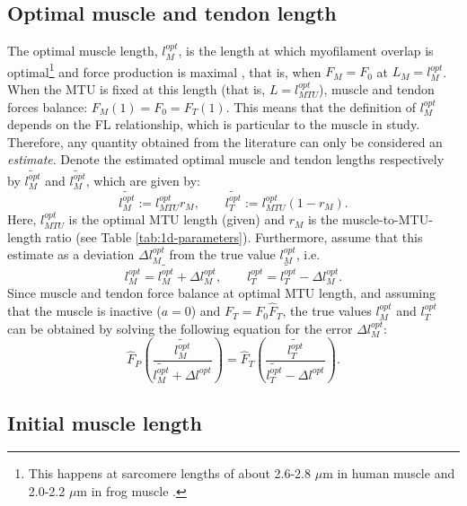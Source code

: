 \documentclass{sfuthesis}
\numberwithin{equation}{section}
\numberwithin{figure}{chapter}
\numberwithin{table}{chapter}
\theoremstyle{definition}
\begin{document}
\subsection{Optimal muscle and tendon length} \label{sec:optimal_muscle_length}

The optimal muscle length, $l_M^{opt}$, is the length at which myofilament overlap is optimal\footnote{This happens at sarcomere lengths of about 2.6-2.8 $\mu$m in human muscle and 2.0-2.2 $\mu$m in frog muscle \cite{FridenLieber1998}.} and force production is maximal \cite{FridenLieber1998}, that is, when $F_M = F_0$ at $L_M = l_M^{opt}$. When the MTU is fixed at this length (that is, $L = l_{MTU}^{opt}$), muscle and tendon forces balance:
$F_M(1) = F_0 = F_T(1)$. This means that the definition of $l_M^{opt}$ depends on the FL relationship, which is particular to the muscle in study. Therefore, any quantity obtained from the literature can only be considered an \textit{estimate}. Denote the estimated optimal muscle and tendon lengths respectively by $\widetilde{l_M^{opt}}$ and $\widetilde{l_M^{opt}}$, which are given by:
\begin{equation}
	\widetilde{l_M^{opt}} := l_{MTU}^{opt} r_M, \qquad \widetilde{l_T^{opt}} := l_{MTU}^{opt}(1-r_M).
\end{equation}
Here, $l_{MTU}^{opt}$ is the optimal MTU length (given) and $r_M$ is the muscle-to-MTU-length ratio (see Table \ref{tab:1d-parameters}). Furthermore, assume that this estimate as a deviation $\Delta l_M^{opt}$ from the true value $l_M^{opt}$, i.e.
\begin{equation}
    l_M^{opt} = \widetilde{l_M^{opt}} + \Delta l_M^{opt}, \qquad l_T^{opt} = \widetilde{l_T^{opt}} - \Delta l_M^{opt}.
\end{equation}
Since muscle and tendon force balance at optimal MTU length, and assuming that the muscle is inactive ($a=0$) and $F_T = F_0 \widehat{F}_T$, the true values $l_M^{opt}$ and $l_T^{opt}$ can be obtained by solving the following equation for the error $\Delta l_M^{opt}$:
\begin{equation} \label{eq:calibration_1}
    \widehat{F}_P\left( \dfrac{\widetilde{l_M^{opt}}}{\widetilde{l_M^{opt}} + \Delta l^{opt}} \right) = \widehat{F}_T \left( \dfrac{\widetilde{l_T^{opt}}}{\widetilde{l_T^{opt}} - \Delta l^{opt}} \right).
\end{equation}

\subsection{Initial muscle length}
\end{document}
